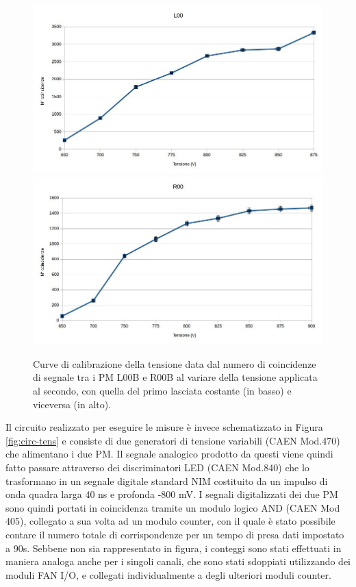 \documentclass{standalone}
\begin{document}
	\begin{figure}[H]
		\begin{center}
			\includegraphics[width=1\textwidth]{./excel-plots/tension-L00c.jpg} %
			\bigbreak
			\includegraphics[width=1\textwidth]{./excel-plots/tension-R00c.jpg} %
      \caption{\small Curve di calibrazione della tensione data dal numero di coincidenze di segnale tra i PM L00B e R00B al variare della tensione applicata al secondo, con quella del primo lasciata costante (in basso) e viceversa (in alto).}
			\label{fig:curva-tens}
		\end{center}
	\end{figure}
	\clearpage
	Il circuito realizzato per eseguire le misure \`e invece schematizzato in Figura \ref{fig:circ-tens} e consiste di due generatori di tensione variabili (CAEN Mod.470) che alimentano i due PM. Il segnale analogico prodotto da questi viene quindi fatto passare attraverso dei discriminatori LED (CAEN Mod.840) che lo trasformano in un segnale digitale standard NIM costituito da un impulso di onda quadra larga 40 ns e profonda -800 mV. I segnali digitalizzati dei due PM sono quindi portati in coincidenza tramite un modulo logico AND (CAEN Mod 405), collegato a sua volta ad un modulo counter, con il quale \`e  stato possibile contare il numero totale di corrispondenze per un tempo di presa dati impostato a 90s. Sebbene non sia rappresentato in figura, i conteggi sono stati effettuati in maniera analoga anche  per i singoli canali, che sono stati sdoppiati utilizzando dei moduli FAN I/O, e collegati individualmente a degli ulteriori moduli counter.\\
\end{document}
